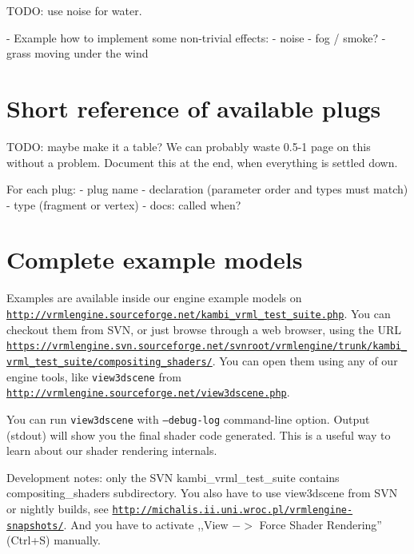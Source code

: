 \documentclass{acmsiggraph}                     %
\newcommand*{\myhref}[2]{\texttt{\href{#1}{\nolinkurl{#2}}}}
\begin{document}
TODO: use noise for water.

- Example how to implement some non-trivial effects:
  - noise
  - fog / smoke?
  - grass moving under the wind

\section{Short reference of available plugs}

TODO: maybe make it a table? We can probably waste 0.5-1 page on this
without a problem. Document this at the end, when everything is settled down.

For each plug:
- plug name
- declaration (parameter order and types must match)
- type (fragment or vertex)
- docs: called when?

\section{Complete example models}

Examples are available inside our engine example models on
\myhref{http://vrmlengine.sourceforge.net/kambi\_vrml\_test\_suite.php}{http://vrmlengine.sourceforge.net/kambi_vrml_test_suite.php}.
You can checkout them from SVN, or just browse through a web browser,
using the URL
\myhref{https://vrmlengine.svn.sourceforge.net/svnroot/vrmlengine/trunk/kambi\_vrml\_test\_suite/compositing\_shaders/}{https://vrmlengine.svn.sourceforge.net/svnroot/vrmlengine/trunk/kambi_vrml_test_suite/compositing_shaders/}.
You can open them using any of our engine tools,
like \texttt{view3dscene} from
\myhref{http://vrmlengine.sourceforge.net/view3dscene.php}{http://vrmlengine.sourceforge.net/view3dscene.php}.

You can run \texttt{view3dscene} with \texttt{--debug-log} command-line
option. Output (stdout) will show you the final shader code generated.
This is a useful way to learn about our shader rendering internals.

Development notes: only the SVN kambi\_vrml\_test\_suite contains
compositing\_shaders subdirectory.
You also have to use view3dscene from SVN or nightly builds,
see \myhref{http://michalis.ii.uni.wroc.pl/vrmlengine-snapshots/}{http://michalis.ii.uni.wroc.pl/vrmlengine-snapshots/}.
And you have to activate ,,View $->$ Force Shader Rendering'' (Ctrl+S) manually.


\nocite{*}

\end{document}
